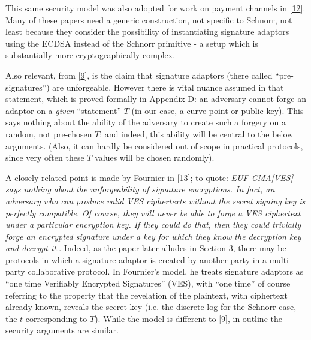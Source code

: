 \documentclass[10pt,a4paper]{article}
\begin{document}
\vspace{5 pt}
This same security model was also adopted for work on payment channels in {[}\protect\hyperlink{anchor-12}{12}{]}. Many of these papers need a generic construction, not specific to Schnorr, not least because they consider the possibility of instantiating signature adaptors using the ECDSA instead of the Schnorr primitive - a setup which is substantially more cryptographically complex.

\vspace{5 pt}
Also relevant, from {[}\protect\hyperlink{anchor-9}{9}{]}, is the claim that signature adaptors (there called ``pre-signatures'') are unforgeable. However there is vital nuance assumed in that statement, which is proved formally in Appendix D: an adversary cannot forge an adaptor on a \emph{given} ``statement'' $T$ (in our case, a curve point or public key). This says nothing about the ability of the adversary to create such a forgery on a random, not pre-chosen $T$; and indeed, this ability will be central to the below arguments. (Also, it can hardly be considered out of scope in practical protocols, since very often these $T$ values will be chosen randomly).

\vspace{5 pt}

A closely related point is made by Fournier in {[}\protect\hyperlink{anchor-13}{13}{]}; to quote: \emph{EUF-CMA[VES] says nothing about the unforgeability of signature encryptions. In fact, an adversary who can produce valid VES ciphertexts without the secret signing key is perfectly compatible. Of course, they will never be able to forge a VES ciphertext under a particular encryption key. If they could do that, then they could trivially forge an encrypted signature under a key for which they know the decryption key and decrypt it.}. Indeed, as the paper later alludes in Section 3, there may be protocols in which a signature adaptor is created by another party in a multi-party collaborative protocol. In Fournier's model, he treats signature adaptors as ``one time Verifiably Encrypted Signatures'' (VES), with ``one time'' of course referring to the property that the revelation of the plaintext, with ciphertext already known, reveals the secret key (i.e. the discrete log for the Schnorr case, the $t$ corresponding to $T$). While the model is different to {[}\protect\hyperlink{anchor-9}{9}{]}, in outline the security arguments are similar.

\vspace{5 pt}
\end{document}
